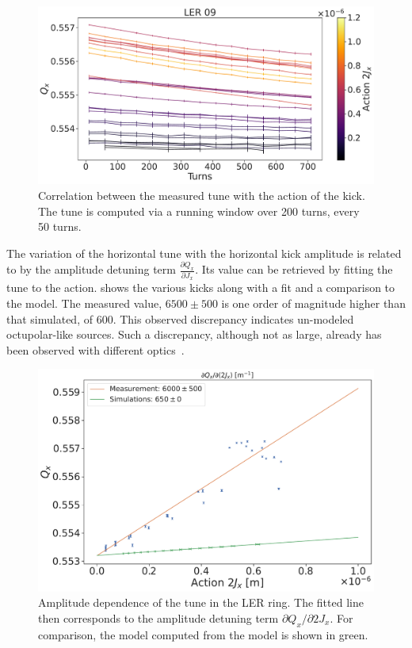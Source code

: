 \begin{figure}[!htb]
    \centering
    \includegraphics[width=0.8\linewidth]{images/kek/LER_detuned_ampdet.pdf}
    \caption{Correlation between the measured tune with the action of the kick. The tune is computed
    via a running window over 200 turns, every 50 turns.}
    \label{fig:kek:ler_full_tune_ampdet}
\end{figure}

The variation of the horizontal tune with the horizontal kick amplitude is related to by the
amplitude detuning term $\frac{\partial Q_x}{\partial J_x}$. Its value can be retrieved by fitting
the tune to the action.  shows the various kicks along with a fit and a
comparison to the model. The measured value, $6500 \pm 500$ is one order of magnitude higher than
that simulated, of $600$. This observed discrepancy indicates un-modeled octupolar-like sources.
Such a discrepancy, although not as large, already has been observed with different
optics~\cite{keintzel_jacqueline_beam_2022}.

\begin{figure}[!htb]
    \centering
    \includegraphics[width=0.7\linewidth]{images/kek/amplitude_detuning.pdf}
    \caption{Amplitude dependence of the tune in the LER ring. The fitted line then corresponds to
    the amplitude detuning term $\partial Q_x/\partial 2J_x$. For comparison, the model computed 
    from the model is shown in green.}
    \label{fig:kek:ler_ampdet}
\end{figure}



